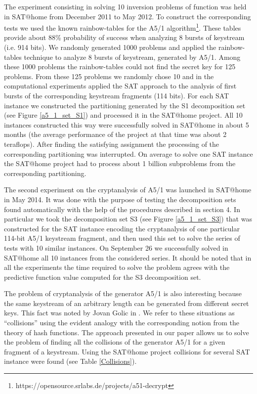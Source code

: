 \documentclass[runningheads,a4paper]{llncs}
\begin{document}
The experiment consisting in solving 10 inversion problems of function  was held in SAT@home from December 2011 to May 2012. To construct the corresponding tests we used the known rainbow-tables for the A5/1 algorithm\footnote{https://opensource.srlabs.de/projects/a51-decrypt}. These tables provide about 88\% probability of success when analyzing 8 bursts of keystream (i.e. 914 bits). We randomly generated 1000 problems and applied the rainbow-tables technique to analyze 8 bursts of keystream, generated by A5/1. Among these 1000 problems the rainbow-tables could not find the secret key for 125 problems. From these 125 problems we randomly chose 10 and in the computational experiments applied the SAT approach to the analysis of first bursts of the corresponding keystream fragments (114 bits). For each SAT instance we constructed the partitioning generated by the S1 decomposition set (see Figure \ref{a5_1_set_S1}) and processed it in the SAT@home project. All 10 instances constructed this way were successfully solved in SAT@home in about 5 months (the average performance of the project at that time was about 2 teraflops). After finding the satisfying assignment the processing of the corresponding partitioning was interrupted. On average to solve one SAT instance the SAT@home project had to process about 1 billion subproblems from the corresponding partitioning.

The second experiment on the cryptanalysis of A5/1 was launched in SAT@home in May 2014. It was done with the purpose of testing the decomposition sets found automatically with the help of the procedures described in section 4. In particular we took the decomposition set S3 (see Figure \ref{a5_1_set_S3}) that was constructed for the SAT instance encoding the cryptanalysis of one particular 114-bit A5/1 keystream fragment, and then used this set to solve the series of tests with 10 similar instances. On September 26 we successfully solved in SAT@home all 10 instances from the considered series. It should be noted that in all the experiments the time required to solve the problem agrees with the predictive function value computed for the S3 decomposition set.

The problem of cryptanalysis of the generator A5/1 is also interesting because the same keystream of an arbitrary length can be generated from different secret keys. This fact was noted by Jovan Golic in \cite{Golic:1997:CAA:1754542.1754566}. We refer to these situations as ``collisions'' using the evident analogy with the corresponding notion from the theory of hash functions. The approach presented in our paper allows us to solve the problem of finding all the collisions of the generator A5/1 for a given fragment of a keystream. Using the SAT@home project collisions for several SAT instance were found (see Table \ref{Collisions}).
\end{document}
